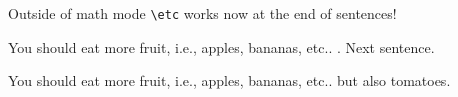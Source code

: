 \documentclass{article}
\makeatletter
\newcommand{\etc}{%
  \mbox{etc}\@ifnextchar.{}{.\@\xspace}%
}
\newcommand{\ie}{i.e.,\xspace}
\makeatother
\begin{document}
\noindent

    \noindent
    Outside of math mode \verb|\etc| works now at the end of sentences!

    \noindent
    You should eat more fruit, \ie apples, bananas, \etc. Next sentence.

    \noindent
    You should eat more fruit, i.e., apples, bananas, \etc but also tomatoes.
\end{document}
